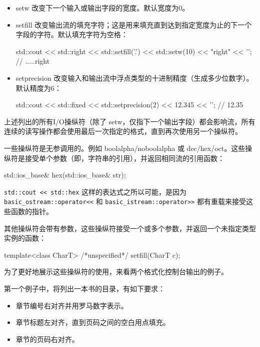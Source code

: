 \begin{itemize}
\item
setw 改变下一个输入或输出字段的宽度。默认宽度为0。

\item
setfill 改变输出流的填充字符；这是用来填充直到达到指定宽度为止的下一个字段的字符。默认填充字符为空格：

\begin{cpp}
std::cout << std::right
          << std::setfill('.') << std::setw(10)
          << "right" << '\n';
// .....right
\end{cpp}

\item
setprecision 改变输入和输出流中浮点类型的十进制精度（生成多少位数字）。默认精度为6：

\begin{cpp}
std::cout << std::fixed << std::setprecision(2) << 12.345 << '\n';
// 12.35
\end{cpp}
\end{itemize}


上述列出的所有I/O操纵符（除了 setw，仅指下一个输出字段）都会影响流，所有连续的读写操作都会使用最后一次指定的格式，直到再次使用另一个操纵符。

一些操纵符是无参调用的。例如 boolalpha/noboolalpha 或 dec/hex/oct。这些操纵符是接受单个参数（即，字符串的引用），并返回相同流的引用函数：

\begin{cpp}
std::ios_base& hex(std::ios_base& str);
\end{cpp}

\verb|std::cout << std::hex| 这样的表达式之所以可能，是因为 \verb|basic_ostream::operator<<| 和 \verb|basic_istream::operator>>| 都有重载来接受这些函数的指针。

其他操纵符会带有参数，这些操纵符接受一个或多个参数，并返回一个未指定类型实例的函数：

\begin{cpp}
template<class CharT>
/*unspecified*/ setfill(CharT c);
\end{cpp}

为了更好地展示这些操纵符的使用，来看两个格式化控制台输出的例子。

第一个例子中，将列出一本书的目录，有如下要求：

\begin{itemize}
\item
章节编号右对齐并用罗马数字表示。

\item
章节标题左对齐，直到页码之间的空白用点填充。

\item
章节的页码右对齐。
\end{itemize}

